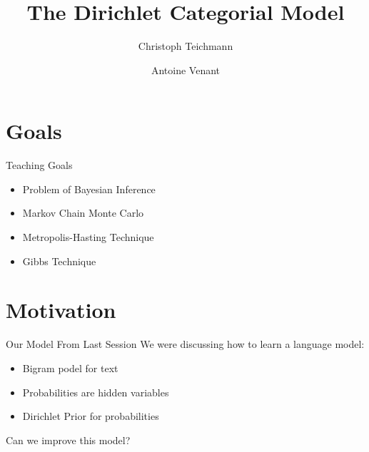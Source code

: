 \documentclass[11pt]{beamer}
\author{Christoph Teichmann \and Antoine Venant}
\title{The Dirichlet Categorial Model}
\subtitle{}
\institute{}
\date{}
\begin{document}
	
	
	\begin{frame}
		\maketitle
	\end{frame}
	
	\section{Goals}
	
	\begin{frame}{Teaching Goals}
		\begin{itemize}
			\item Problem of Bayesian Inference
			\item Markov Chain Monte Carlo
			\item Metropolis-Hasting Technique
			\item Gibbs Technique
		\end{itemize}
	\end{frame}
	
	\section{Motivation}
	
	\begin{frame}{Our Model From Last Session}
		\centering
		We were discussing how to learn a language model:
		
		\vspace{10pt} \begin{itemize}
			\item Bigram podel for text
			\item Probabilities are hidden variables
			\item Dirichlet Prior for probabilities
		\end{itemize}
		
		\vspace{10pt} Can we improve this model?
	\end{frame}
		
\end{document}
